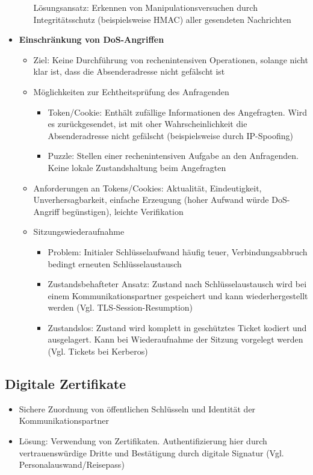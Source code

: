 \begin{itemize}
\begin{itemize}
		Lösungsansatz: Erkennen von Manipulationsversuchen durch Integritätsschutz (beispielsweise HMAC) aller gesendeten Nachrichten
	\end{itemize}
	\item \textbf{Einschränkung von DoS-Angriffen}
	\begin{itemize}
		\item Ziel: Keine Durchführung von rechenintensiven Operationen, solange nicht klar ist, dass die Absenderadresse nicht gefälscht ist
		\item Möglichkeiten zur Echtheitsprüfung des Anfragenden
		\begin{itemize}
			\item Token/Cookie: Enthält zufällige Informationen des Angefragten. Wird es zurückgesendet, ist mit oher Wahrscheinlichkeit die Absenderadresse nicht gefälscht (beispielsweise durch IP-Spoofing)
			\item Puzzle: Stellen einer rechenintensiven Aufgabe an den Anfragenden. Keine lokale Zustandshaltung beim Angefragten
		\end{itemize}
		\item Anforderungen an Tokens/Cookies: Aktualität, Eindeutigkeit, Unverhersagbarkeit, einfache Erzeugung (hoher Aufwand würde DoS-Angriff begünstigen), leichte Verifikation
		\item Sitzungswiederaufnahme
		\begin{itemize}
			\item Problem: Initialer Schlüsselaufwand häufig teuer, Verbindungsabbruch bedingt erneuten Schlüsselaustausch
			\item Zustandsbehafteter Ansatz: Zustand nach Schlüsselaustausch wird bei einem Kommunikationspartner gespeichert und kann wiederhergestellt werden (Vgl. TLS-Session-Resumption)
			\item Zustandslos: Zustand wird komplett in geschütztes Ticket kodiert und ausgelagert. Kann bei Wiederaufnahme der Sitzung vorgelegt werden (Vgl. Tickets bei Kerberos)
		\end{itemize}
	\end{itemize}
\end{itemize}


\subsection{Digitale Zertifikate}
\begin{itemize}
	\item Sichere Zuordnung von öffentlichen Schlüsseln und Identität der Kommunikationspartner
	\item Lösung: Verwendung von Zertifikaten. Authentifizierung hier durch vertrauenswürdige Dritte und Bestätigung durch digitale Signatur (Vgl. Personalauswand/Reisepass)
\end{itemize}



